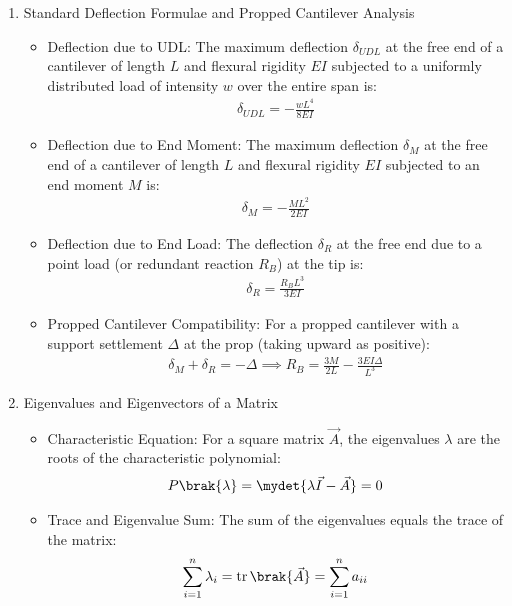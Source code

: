\begin{enumerate}[label=\thesubsection.\arabic*, ref=\thesubsection.\theenumi,itemsep=0pt]
\item Standard Deflection Formulae and Propped Cantilever Analysis
\begin{itemize}
\item Deflection due to UDL: The maximum deflection $\delta_{UDL}$ at the free end of a cantilever of length $L$ and flexural rigidity $EI$ subjected to a uniformly distributed load of intensity $w$ over the entire span is:
\begin{align}
\delta_{UDL} = -\frac{wL^4}{8EI} \label{eq:cantilever_deflection_udl}
\end{align}
\item Deflection due to End Moment: The maximum deflection $\delta_M$ at the free end of a cantilever of length $L$ and flexural rigidity $EI$ subjected to an end moment $M$ is:
\begin{align}
\delta_M = -\frac{ML^2}{2EI} \label{eq:cantilever_deflection_moment}
\end{align}
\item Deflection due to End Load: The deflection $\delta_R$ at the free end due to a point load (or redundant reaction $R_B$) at the tip is:
\begin{align}
\delta_R = \frac{R_B L^3}{3EI} \label{eq:cantilever_deflection_load}
\end{align}
\item Propped Cantilever Compatibility: For a propped cantilever with a support settlement $\Delta$ at the prop (taking upward as positive):
\begin{align}
\delta_M + \delta_R = -\Delta \implies R_B = \frac{3M}{2L} - \frac{3EI\Delta}{L^3} \label{eq:propped_cantilever_compat}
\end{align}
\end{itemize}

\item Eigenvalues and Eigenvectors of a Matrix
\begin{itemize}
\item Characteristic Equation: For a square matrix $\vec{A}$, the eigenvalues $\lambda$ are the roots of the characteristic polynomial:
\begin{align}
P\brak{\lambda} = \mydet{\lambda \vec{I} - \vec{A}} = 0 \label{eq:char_equation}
\end{align}
\item Trace and Eigenvalue Sum: The sum of the eigenvalues equals the trace of the matrix:
\begin{align}
\sum_{i=1}^n \lambda_i = \operatorname{tr}\brak{\vec{A}} = \sum_{i=1}^n a_{ii} \label{eq:eigenvalue_trace}
\end{align}
\end{itemize}


\end{enumerate}
